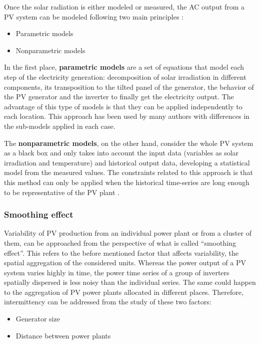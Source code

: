 Once the solar radiation is either modeled or measured, the AC output from a PV system can be modeled following two main principles \cite*{Almeida2015}:

\begin{itemize}
\item Parametric models
\item Nonparametric models
\end{itemize}

In the first place, \textbf{parametric models} are a set of equations that model each step of the electricity generation: decomposition of solar irradiation in different components, its transposition to the tilted panel of the generator, the behavior of the PV generator and the inverter to finally get the electricity output. The advantage of this type of models is that they can be applied independently to each location. This approach has been used by many authors \cite*{Bofinger2006, Lorenz2008, Lorenz2011} with differences in the sub-models applied in each case.

The \textbf{nonparametric models}, on the other hand, consider the whole PV system as a black box and only takes into account the input data (variables as solar irradiation and temperature) and historical output data, developing a statistical model from the measured values. The constraints related to this approach is that this method can only be applied when the historical time-series are long enough to be representative of the PV plant \cite*{bacher2009online}.

\subsubsection{Smoothing effect}

Variability of PV production from an individual power plant or from a cluster of them, can be approached from the perspective of what is called ``smoothing effect''. This refers to the before mentioned factor that affects variability, the spatial aggregation of the considered units. Whereas the power output of a PV system varies highly in time, the power time series of a group of inverters spatially dispersed is less noisy than the individual series. The same could happen to the aggregation of PV power plants allocated in different places. Therefore, intermittency can be addressed from the study of these two factors:

\begin{itemize}
\item{Generator size}
\item{Distance between power plants}
\end{itemize}

